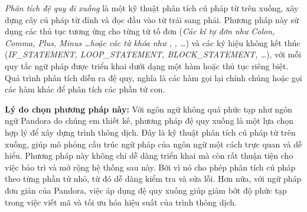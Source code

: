 \textit{Phân tích đệ quy đi xuống} là một kỹ thuật phân tích cú pháp từ trên xuống, xây dựng cây cú pháp từ đỉnh và đọc đầu vào từ trái sang phải. Phương pháp này sử dụng các thủ tục tương ứng cho từng từ tố đơn (\textit{\emph{Các kí tự đơn như} Colon, Comma, Plus, Minus \dots \emph{hoặc các từ khóa như} , , \dots }) và các ký hiệu không kết thúc (\textit{IF\_STATEMENT, LOOP\_STATEMENT, BLOCK\_STATEMENT, \dots}), với mỗi \\quy tắc ngữ pháp được triển khai dưới dạng một hàm hoặc thủ tục riêng biệt. Quá trình phân tích diễn ra đệ quy, nghĩa là các hàm gọi lại chính chúng hoặc gọi các hàm khác để phân tích các phần tử con.

\textbf{Lý do chọn phương pháp này:} Với ngôn ngữ không quá phức tạp như ngôn ngữ Pandora do chúng em thiết kế, phương pháp đệ quy xuống là một lựa chọn hợp lý để xây dựng trình thông dịch. Đây là kỹ thuật phân tích cú pháp từ trên xuống, giúp mô phỏng cấu trúc ngữ pháp của ngôn ngữ một cách trực quan và dễ hiểu. Phương pháp này không chỉ dễ dàng triển khai mà còn rất thuận tiện cho việc bảo trì và mở rộng hệ thống sau này. Bởi vì nó cho phép phân tích cú pháp theo từng phần tử nhỏ, từ đó dễ dàng kiểm tra và sửa lỗi. Hơn nữa, với ngữ pháp đơn giản của Pandora, việc áp dụng đệ quy xuống giúp giảm bớt độ phức tạp trong việc viết mã và tối ưu hóa hiệu suất của trình thông dịch.